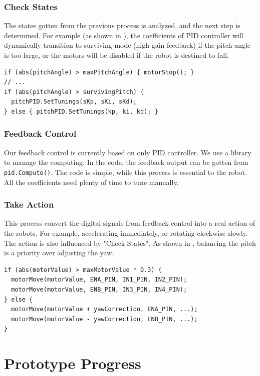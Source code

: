 \documentclass[9pt,a4paper,twocolumn]{tau-class/tau}
\begin{document}
\subsubsection{Check States}
The states gotten from the previous process is analyzed, and the next step is determined. For example (as shown in ), the coefficients of PID controller will dynamically transition to surviving mode (high-gain feedback) if the pitch angle is too large, or the motors will be disabled if the robot is destined to fall.

\begin{lstlisting}[caption={Example code of "Check States" process}, label={lst:code_check_states}]
if (abs(pitchAngle) > maxPitchAngle) { motorStop(); }
// ...
if (abs(pitchAngle) > survivingPitch) {
  pitchPID.SetTunings(sKp, sKi, sKd);
} else { pitchPID.SetTunings(kp, ki, kd); }
\end{lstlisting}

\subsubsection{Feedback Control}
Our feedback control is currently based on only PID controller. We use a library to manage the computing. In the code, the feedback output can be gotten from \texttt{pid.Compute()}. The code is simple, while this process is essential to the robot. All the coefficients need plenty of time to tune manually.

\subsubsection{Take Action}
This process convert the digital signals from feedback control into a real action of the robots. For example, accelerating immediately, or rotating clockwise slowly. The action is also influenced by "Check States". As shown in , balancing the pitch is a priority over adjusting the yaw.
\begin{lstlisting}[caption={Example code of "Take Action" process}, label={lst:code_take_action}]
if (abs(motorValue) > maxMotorValue * 0.3) {
  motorMove(motorValue, ENA_PIN, IN1_PIN, IN2_PIN);
  motorMove(motorValue, ENB_PIN, IN3_PIN, IN4_PIN);
} else {
  motorMove(motorValue + yawCorrection, ENA_PIN, ...);
  motorMove(motorValue - yawCorrection, ENB_PIN, ...);
}
\end{lstlisting}

\section{Prototype Progress}
\end{document}
